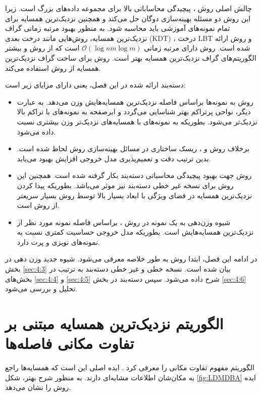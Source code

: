 چالش اصلی روش ، پیچیدگی محاساباتی بالا برای مجموعه داده‌های بزرگ است. زیرا این روش دو مسئله بهینه‌سازی دوگان حل می‌کند و همچنین  نزدیک‌ترین همسایه برای تمام نمونه‌های آموزشی باید محاسبه شود. به منظور بهبود مرتبه زمانی گراف نزدیک‌ترین همسایه، روش‌هایی مانند درخت  بعدی (\gls{KDT}) \cite{friedman1977}، درخت \gls{LBT} \cite{chen2007} و روش  ارائه شده است. روش  دارای مرتبه زمانی  $\mathcal{O}(\log nm\log m)$ است که از روش  و بیشتر الگوریتم‌های گراف نزدیک‌ترین همسایه بهتر است. روش  برای ساخت گراف نزدیک‌ترین همسایه از روش  استفاده می‌کند.

دسته‌بند ارائه شده در این فصل، یعنی  دارای مزایای زیر است:  
\begin{itemize}[label=$\bullet$]
	\item	روش  به نمونه‌ها براساس فاصله نزدیک‌ترین همسایه‌هایش وزن می‌دهد. به عبارت دیگر، نواحی پرتراکم بهتر شناسایی می‌گردد و ابرصفحه به نمونه‌های با تراکم بالا نزدیک‌تر می‌شود. بطوریکه به نمونه‌های با همسایه‌های نزدیک‌تر وزن بیشتری نسبت داده می‌شود.
	\item برخلاف روش  و ، ریسک ساختاری در مسائل بهینه‌سازی روش  لحاظ شده است. بدین ترتیب دقت و تعمیم‌پذیری مدل خروجی افزایش بهبود می‌یابد.
	\item روش  جهت بهبود پیچیدگی محاسباتی دسته‌بند بکار گرفته شده است. همچنین این روش برای نسخه غیر خطی دسته‌بند  نیز موثر می‌باشد. بطوریکه پیدا کردن  نزدیک‌ترین همسایه در فضای ویژگی با ابعاد بسیار بالا توسط روش  بسیار سریعتر از روش  است.
	\item شیوه وزن‌دهی به یک نمونه در روش ، براساس فاصله نمونه مورد نظر از نزدیک‌ترین همسایه‌هایش است. بطوریکه مدل خروجی حساسیت کمتری نسبت به نمونه‌های نویزی و پرت دارد.
\end{itemize}

در ادامه این فصل، ابتدا روش  به طور خلاصه معرفی می‌شود. شیوه جدید وزن دهی در بخش \ref{sec:4:3} بیان شده است. نسخه خطی و غیر خطی دسته‌بند  به ترتیب در بخش‌های \ref{sec:4:4} و \ref{sec:4:5} شرح داده می‌شود. سپس دسته‌بند در بخش \ref{sec:4:6} تحلیل و بررسی می‌شود.

\section{الگوریتم نزدیک‌ترین همسایه مبتنی بر تفاوت مکانی فاصله‌ها}\label{sec:4:2}
الگوریتم  مفهوم تفاوت مکانی را معرفی کرد \cite{xia2015}. ایده اصلی این است که همسایه‌ها راجع به مکان‌شان اطلاعات مشابه‌ای دارند. به منظور شرح بهتر، شکل \ref{fig:LDMDBA}  ایده روش  را نشان می‌دهد.

